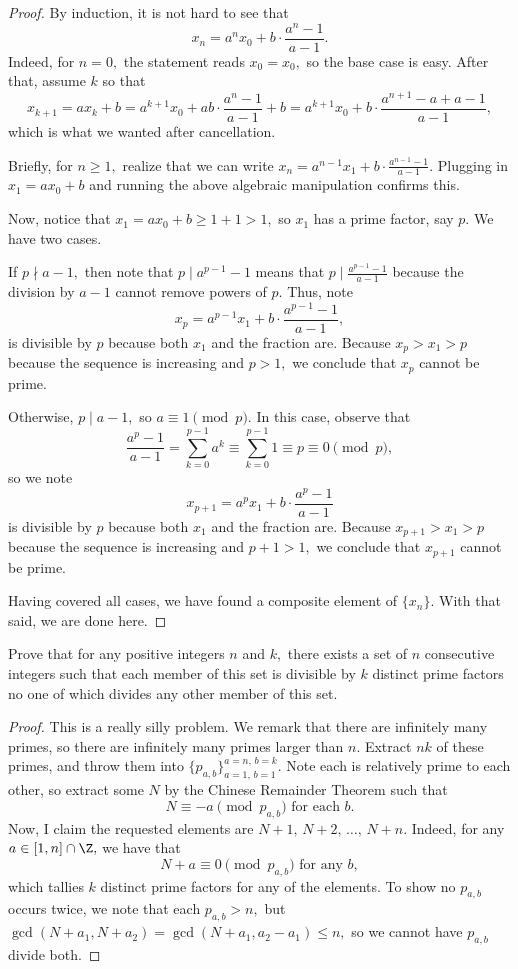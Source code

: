\begin{proof}
By induction, it is not hard to see that
\[x_n=a^nx_0+b\cdot\frac{a^n-1}{a-1}.\]
Indeed, for $n=0,$ the statement reads $x_0=x_0,$ so the base case is easy. After that, assume $k$ so that
\[x_{k+1}=ax_k+b=a^{k+1}x_0+ab\cdot\frac{a^n-1}{a-1}+b=a^{k+1}x_0+b\cdot\frac{a^{n+1}-a+a-1}{a-1},\]
which is what we wanted after cancellation.

Briefly, for $n\ge1,$ realize that we can write $x_n=a^{n-1}x_1+b\cdot\frac{a^{n-1}-1}{a-1}.$ Plugging in $x_1=ax_0+b$ and running the above algebraic manipulation confirms this.

Now, notice that $x_1=ax_0+b\ge1+1>1,$ so $x_1$ has a prime factor, say $p.$ We have two cases.

If $p\nmid a-1,$ then note that $p\mid a^{p-1}-1$ means that $p\mid\frac{a^{p-1}-1}{a-1}$ because the division by $a-1$ cannot remove powers of $p.$ Thus, note
\[x_p=a^{p-1}x_1+b\cdot\frac{a^{p-1}-1}{a-1},\]
is divisible by $p$ because both $x_1$ and the fraction are. Because $x_p>x_1>p$ because the sequence is increasing and $p>1,$ we conclude that $x_p$ cannot be prime.

Otherwise, $p\mid a-1,$ so $a\equiv1\pmod p.$ In this case, observe that
\[\frac{a^p-1}{a-1}=\sum_{k=0}^{p-1}a^k\equiv\sum_{k=0}^{p-1}1\equiv p\equiv0\pmod p,\]
so we note
\[x_{p+1}=a^px_1+b\cdot\frac{a^p-1}{a-1}\]
is divisible by $p$ because both $x_1$ and the fraction are. Because $x_{p+1}>x_1>p$ because the sequence is increasing and $p+1>1,$ we conclude that $x_{p+1}$ cannot be prime.

Having covered all cases, we have found a composite element of $\{x_n\}.$ With that said, we are done here.
\end{proof}

\begin{exercise}[20]
Prove that for any positive integers $n$ and $k,$ there exists a set of $n$ consecutive integers such that each member of this set is divisible by $k$ distinct prime factors no one of which divides any other member of this set.
\end{exercise}

\begin{proof}
This is a really silly problem. We remark that there are infinitely many primes, so there are infinitely many primes larger than $n.$ Extract $nk$ of these primes, and throw them into $\{p_{a,b}\}_{a=1,\,b=1}^{a=n,\,b=k}.$ Note each is relatively prime to each other, so extract some $N$ by the Chinese Remainder Theorem such that
\[N\equiv-a\pmod{p_{a,b}}\text{ for each }b.\]
Now, I claim the requested elements are $N+1,\,N+2,\,\ldots,\,N+n.$ Indeed, for any $a\in[1,n]\cap\Z,$ we have that
\[N+a\equiv0\pmod{p_{a,b}}\text{ for any }b,\]
which tallies $k$ distinct prime factors for any of the elements. To show no $p_{a,b}$ occurs twice, we note that each $p_{a,b}>n,$ but $\gcd(N+a_1,N+a_2)=\gcd(N+a_1,a_2-a_1)\le n,$ so we cannot have $p_{a,b}$ divide both.
\end{proof}

